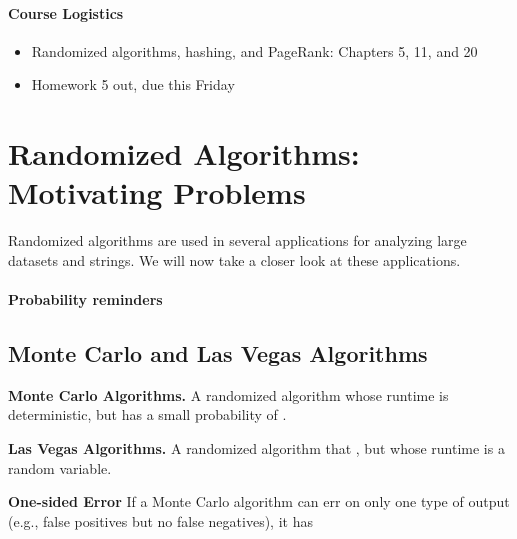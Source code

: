 \documentclass[11pt]{exam}
\begin{document}
	
	
	\paragraph{Course Logistics}
	
	\begin{itemize}
		\item Randomized algorithms, hashing, and PageRank: Chapters 5, 11, and 20
		\item Homework 5 out, due this Friday
	\end{itemize}
	
	
	
	\section{Randomized Algorithms: Motivating Problems}

	
	Randomized algorithms are used in several applications for analyzing large datasets and strings. We will now take a closer look at these applications. \\
	
	\paragraph{Probability reminders}
	
	
	\newpage
	
	\subsection{Monte Carlo and Las Vegas Algorithms}
	\textbf{Monte Carlo Algorithms.} A randomized algorithm whose runtime is deterministic, but has a small probability of . \\
	\vfill
	
	
	\textbf{Las Vegas Algorithms.} 
	A randomized algorithm that , but whose runtime is a random variable. \\
	
	
	\vfill
	
	\textbf{One-sided Error} If a Monte Carlo algorithm can err on only one type of output (e.g., false positives but no false negatives), it has \\ %
	
\end{document}
